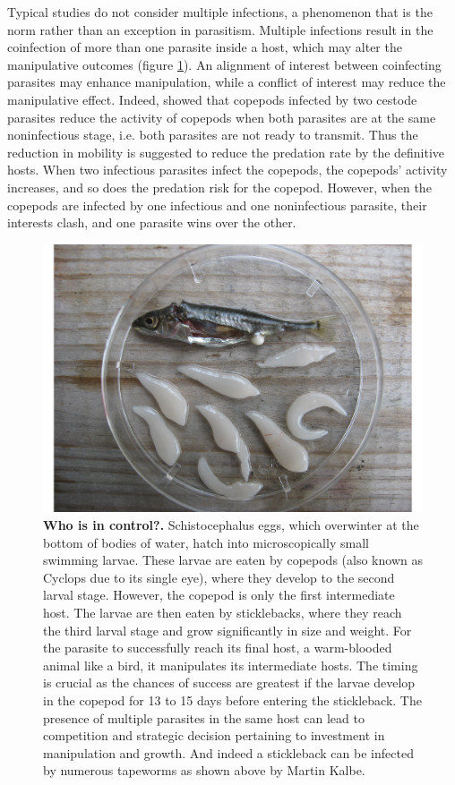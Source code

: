 \documentclass[a4paper]{scrartcl}
\begin{document}
Typical studies do not consider multiple infections, a phenomenon that is the norm rather than an exception in parasitism. 
Multiple infections result in the coinfection of more than one parasite inside a host, which may alter the manipulative outcomes (figure \ref{fig:empirical}). 
An alignment of interest between coinfecting parasites may enhance manipulation, while a conflict of interest may reduce the manipulative effect. 
Indeed, \cite{Hafer:2015gl} showed that copepods infected by two cestode parasites reduce the activity of copepods when both parasites are at the same noninfectious stage, i.e. both parasites are not ready to transmit. 
Thus the reduction in mobility is suggested to reduce the predation rate by the definitive hosts. 
When two infectious parasites infect the copepods, the copepods' activity increases, and so does the predation risk for the copepod. 
However, when the copepods are infected by one infectious and one noninfectious parasite, their interests clash, and one parasite wins over the other. 

\begin{figure}[ht!]
\captionsetup{format=plain}
\centering
\includegraphics[width=0.75\columnwidth]{Figures/Sept_10_ 101.pdf}
\caption{\textbf{Who is in control?.}
Schistocephalus eggs, which overwinter at the bottom of bodies of water, hatch into microscopically small swimming larvae. 
These larvae are eaten by copepods (also known as Cyclops due to its single eye), where they develop to the second larval stage. 
However, the copepod is only the first intermediate host. 
The larvae are then eaten by sticklebacks, where they reach the third larval stage and grow significantly in size and weight. 
For the parasite to successfully reach its final host, a warm-blooded animal like a bird, it manipulates its intermediate hosts. 
The timing is crucial as the chances of success are greatest if the larvae develop in the copepod for 13 to 15 days before entering the stickleback. 
The presence of multiple parasites in the same host can lead to competition and strategic decision pertaining to investment in manipulation and growth.
And indeed a stickleback can be infected by numerous tapeworms as shown above by Martin Kalbe.
}
\label{fig:empirical}
\end{figure}
\end{document}
